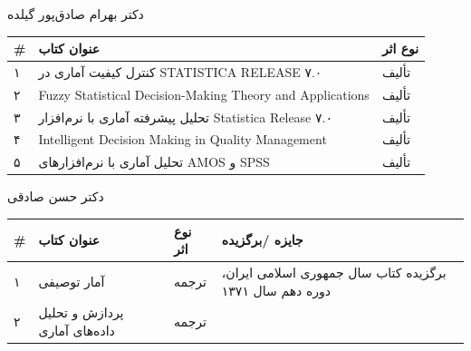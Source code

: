 \documentclass[
  letterpaper,
  DIV=11,
  numbers=noendperiod]{scrreprt}
\newcounter{none} %
\begin{document}
دکتر بهرام صادق‌پور گیلده

{\def\LTcaptype{none} %
\begin{longtable}[]{@{}
  >{\raggedright\arraybackslash}p{}
  >{\raggedright\arraybackslash}p{}
  >{\raggedright\arraybackslash}p{}@{}}
\toprule\noalign{}
\begin{minipage}[b]{\linewidth}\raggedright
\#
\end{minipage} & \begin{minipage}[b]{\linewidth}\raggedright
عنوان کتاب
\end{minipage} & \begin{minipage}[b]{\linewidth}\raggedright
نوع اثر
\end{minipage} \\
\midrule\noalign{}
\endhead
\bottomrule\noalign{}
\endlastfoot
۱ & کنترل کیفیت آماری در STATISTICA RELEASE ۷.۰ & تألیف \\
۲ & Fuzzy Statistical Decision-Making Theory and Applications & تألیف \\
۳ & تحلیل پیشرفته آماری با نرم‌افزار Statistica Release ۷.۰ & تألیف \\
۴ & Intelligent Decision Making in Quality Management & تألیف \\
۵ & تحلیل آماری با نرم‌افزارهای AMOS و SPSS & تألیف \\
\end{longtable}
}

دکتر حسن صادقی

{\def\LTcaptype{none} %
\begin{longtable}[]{@{}
  >{\raggedright\arraybackslash}p{}
  >{\raggedright\arraybackslash}p{}
  >{\raggedright\arraybackslash}p{}
  >{\raggedright\arraybackslash}p{}@{}}
\toprule\noalign{}
\begin{minipage}[b]{\linewidth}\raggedright
\#
\end{minipage} & \begin{minipage}[b]{\linewidth}\raggedright
عنوان کتاب
\end{minipage} & \begin{minipage}[b]{\linewidth}\raggedright
نوع اثر
\end{minipage} & \begin{minipage}[b]{\linewidth}\raggedright
جایزه /برگزیده
\end{minipage} \\
\midrule\noalign{}
\endhead
\bottomrule\noalign{}
\endlastfoot
۱ & آمار توصیفی & ترجمه & برگزیده کتاب سال جمهوری اسلامی ایران، دوره دهم
سال ۱۳۷۱ \\
۲ & پردازش و تحلیل داده‌های آماری & ترجمه & \\
\end{longtable}
}
\end{document}
